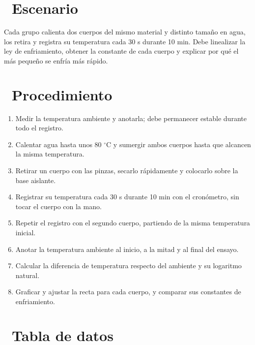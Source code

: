 \documentclass[11pt,a4paper]{article}
\newcommand{\iconotexto}[2]{\textcolor{cyanNeon}{\faIcon{#1}}~#2}
\begin{document}
\section{\iconotexto{flask}{Escenario}}

Cada grupo calienta dos cuerpos del mismo material y distinto tamaño en agua, los retira y registra su temperatura cada 30 s durante 10 min. Debe linealizar la ley de enfriamiento, obtener la constante de cada cuerpo y explicar por qué el más pequeño se enfría más rápido.

\section{\iconotexto{list-ol}{Procedimiento}}

\begin{enumerate}[leftmargin=1.4em,itemsep=2pt,topsep=3pt]
  \item Medir la temperatura ambiente y anotarla; debe permanecer estable durante todo el registro.
  \item Calentar agua hasta unos 80 $^{\circ}$C y sumergir ambos cuerpos hasta que alcancen la misma temperatura.
  \item Retirar un cuerpo con las pinzas, secarlo rápidamente y colocarlo sobre la base aislante.
  \item Registrar su temperatura cada 30 s durante 10 min con el cronómetro, sin tocar el cuerpo con la mano.
  \item Repetir el registro con el segundo cuerpo, partiendo de la misma temperatura inicial.
  \item Anotar la temperatura ambiente al inicio, a la mitad y al final del ensayo.
  \item Calcular la diferencia de temperatura respecto del ambiente y su logaritmo natural.
  \item Graficar y ajustar la recta para cada cuerpo, y comparar sus constantes de enfriamiento.
\end{enumerate}

\section{\iconotexto{table}{Tabla de datos}}
\end{document}
